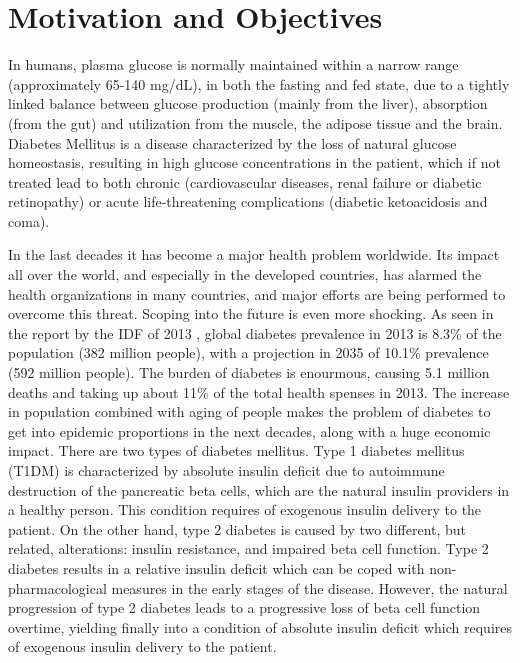 \chapter*{Motivation and Objectives}
\label{sec:motivation}

In humans, plasma glucose is normally maintained within a narrow range (approximately 65-140 mg/dL), in both the fasting and fed state, due to a tightly linked balance between glucose production (mainly from the liver), absorption (from the gut) and utilization from the muscle, the adipose tissue and the brain. Diabetes Mellitus is a disease characterized by the loss of natural glucose homeostasis, resulting in high glucose concentrations in the patient, which if not treated lead to both chronic (cardiovascular diseases, renal failure or diabetic retinopathy) or acute life-threatening complications (diabetic ketoacidosis and coma).

In the last decades it has become a major health problem worldwide. Its impact all over the world, and especially in the developed countries, has alarmed the health organizations in many countries, and major efforts are being performed to overcome this threat. Scoping into the future is even more shocking. As seen in the report by the IDF of 2013 \cite{IDFatlas}, global diabetes prevalence in 2013 is 8.3\% of the population (382 million people), with a projection in 2035 of 10.1\% prevalence (592 million people). The burden of diabetes is enourmous, causing 5.1 million deaths and taking up about 11\% of the total health spenses in 2013. The increase in population combined with aging of people makes the problem of diabetes to get into epidemic proportions in the next decades, along with a huge economic impact.
There are two types of diabetes mellitus. Type 1 diabetes mellitus (T1DM) is characterized by absolute insulin deficit due to autoimmune destruction of the pancreatic beta cells, which are the natural insulin providers in a healthy person. This condition requires of exogenous insulin delivery to the patient. On the other hand, type 2 diabetes is caused by two different, but related, alterations: insulin resistance, and impaired beta cell function. Type 2 diabetes results in a relative insulin deficit which can be coped with non-pharmacological measures in the early stages of the disease. However, the natural progression of type 2 diabetes leads to a progressive loss of beta cell function overtime, yielding finally into a condition of absolute insulin deficit which requires of exogenous insulin delivery to the patient.

